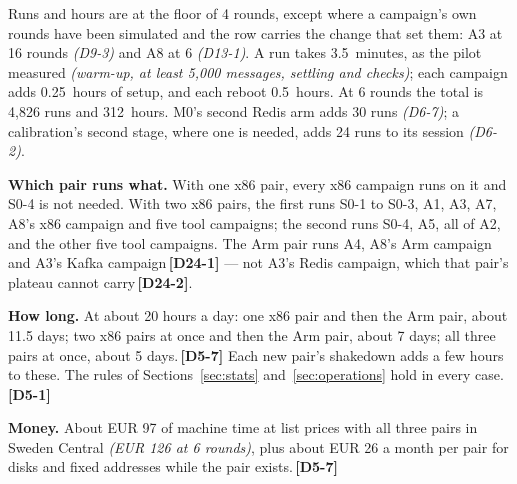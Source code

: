 \documentclass[11pt]{article}
\newcommand{\gl}[1]{{\color{soft}\itshape\small (#1)}}
\newcommand{\chgold}[1]{\,{\color{oldcol}\bfseries\footnotesize[#1]}}
\begin{document}
Runs and hours are at the floor of 4 rounds, except where a campaign's own rounds have been
simulated and the row carries the change that set them: A3 at 16 rounds \gl{D9-3} and A8 at 6
\gl{D13-1}. A run takes 3.5~minutes, as the pilot measured \gl{warm-up, at least 5,000 messages, settling and checks}; each campaign adds 0.25~hours of setup, and each reboot 0.5~hours. At 6 rounds the total is 4,826 runs and 312~hours. M0's second Redis arm adds 30 runs \gl{D6-7}; a calibration's second stage, where one is needed, adds 24 runs to its session \gl{D6-2}.

\textbf{Which pair runs what.} With one x86 pair, every x86 campaign runs on it and S0-4 is not needed. With two x86 pairs, the first runs S0-1 to S0-3, A1, A3, A7, A8's x86 campaign and five tool campaigns; the second runs S0-4, A5, all of A2, and the other five tool campaigns. The Arm pair runs A4, A8's Arm campaign and A3's Kafka campaign\chgold{D24-1} --- not A3's Redis campaign, which that pair's plateau cannot carry\chgold{D24-2}.

\textbf{How long.} At about 20 hours a day: one x86 pair and then the Arm pair, about 11.5 days; two x86 pairs at once and then the Arm pair, about 7 days; all three pairs at once, about 5 days.\chgold{D5-7} Each new pair's shakedown adds a few hours to these. The rules of Sections~\ref{sec:stats} and~\ref{sec:operations} hold in every case.\chgold{D5-1}

\textbf{Money.} About EUR 97 of machine time at list prices with all three pairs in Sweden Central \gl{EUR 126 at 6 rounds}, plus about EUR 26 a month per pair for disks and fixed addresses while the pair exists.\chgold{D5-7}
\end{document}
